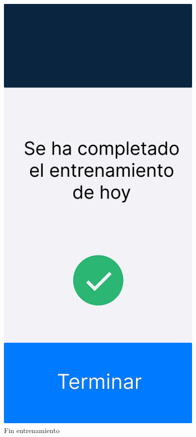 \begin{figure}[H]
\begin{minipage}{0.45\textwidth}
      \label{fig:Realizando ejercicio midiendo tiempo}
   \end{minipage}%
   \hspace{0.5cm}
   \begin{minipage}{0.45\textwidth}
      \centering
      \includegraphics[width=0.9\textwidth]{fotos/Frame 20.png}
      \caption{Fin entrenamiento}
      \label{fig:Fin entrenamiento}
   \end{minipage}
\end{figure}

